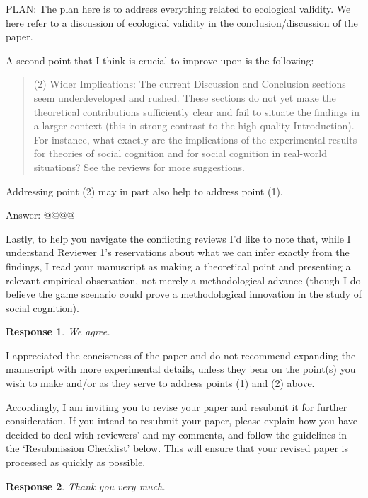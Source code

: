 \documentclass[a4paper]{article}
\newtheorem{response}{Response}
\newenvironment{robin}{\smallskip \noindent \color{red!10!green!50!blue}}{\color{black}\smallskip}
\begin{document}
\begin{robin}
PLAN: The plan here is to address everything related to ecological validity. We here refer to a discussion of ecological validity in the conclusion/discussion of the paper. 

\end{robin} 


A second point that I think is crucial to improve upon is the following:
\begin{quote}
(2)    Wider Implications: The current Discussion and Conclusion sections seem underdeveloped and rushed. These sections do not yet make the theoretical contributions sufficiently clear and fail to situate the findings in a larger context (this in strong contrast to the high-quality Introduction). For instance, what exactly are the implications of the experimental results for theories of social cognition and for social cognition in real-world situations? See the reviews for more suggestions.
\end{quote}
Addressing point (2) may in part also help to address point (1). 


\begin{robin}Answer: @@@@
\end{robin}



Lastly, to help you navigate the conflicting reviews I’d like to note that, while I understand Reviewer 1’s reservations about what we can infer exactly from the findings, I read your manuscript as making a theoretical point and presenting a relevant empirical observation, not merely a methodological advance (though I do believe the game scenario could prove a methodological innovation in the study of social cognition). 

\begin{response}
We agree.
\end{response}

I appreciated the conciseness of the paper and do not recommend expanding the manuscript with more experimental details, unless they bear on the point(s) you wish to make and/or as they serve to address points (1) and (2) above. 

Accordingly, I am inviting you to revise your paper and resubmit it for further consideration. If you intend to resubmit your paper, please explain how you have decided to deal with reviewers’ and my comments, and follow the guidelines in the ‘Resubmission Checklist’ below. This will ensure that your revised paper is processed as quickly as possible. 

\begin{response}
Thank you very much. 
\end{response}
\end{document}
